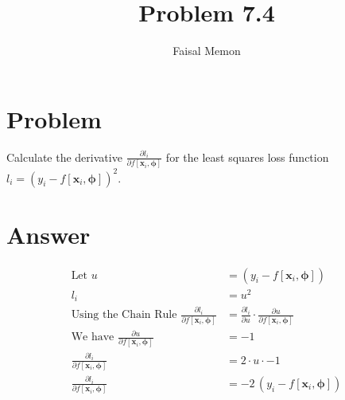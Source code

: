 \documentclass{article}
\title{Problem 7.4}
\author{Faisal Memon}
\begin{document}
\maketitle

\section{Problem}

Calculate the derivative $\frac{\partial{l_{i}}}{\partial{f[\boldsymbol{x}_{i}, \boldsymbol{\phi}]}}$
for the least squares loss function
   $ l_{i} = (y_{i} - f[\boldsymbol{x}_{i}, \boldsymbol{\phi}])^2$.

\section{Answer}

\begin{align*}
\text{Let } u &= (y_{i} - f[\boldsymbol{x}_{i}, \boldsymbol{\phi}]) \\
l_{i} &= u^2 \\
\text{Using the Chain Rule }\frac{\partial{l_{i}}}{\partial{f[\boldsymbol{x}_{i}, \boldsymbol{\phi}]}} &= \frac{\partial{l_{i}}}{\partial{u}} \cdot \frac{\partial{u}}{\partial{f[\boldsymbol{x}_{i}, \boldsymbol{\phi}]}} \\
\text{We have }\frac{\partial{u}}{\partial{f[\boldsymbol{x}_{i}, \boldsymbol{\phi}]}} &= -1 \\
\frac{\partial{l_{i}}}{\partial{f[\boldsymbol{x}_{i}, \boldsymbol{\phi}]}} &= 2 \cdot u \cdot -1 \\
\frac{\partial{l_{i}}}{\partial{f[\boldsymbol{x}_{i}, \boldsymbol{\phi}]}} &= -2 \,(y_{i} - f[\boldsymbol{x}_{i}, \boldsymbol{\phi}])
\end{align*}
\end{document}
